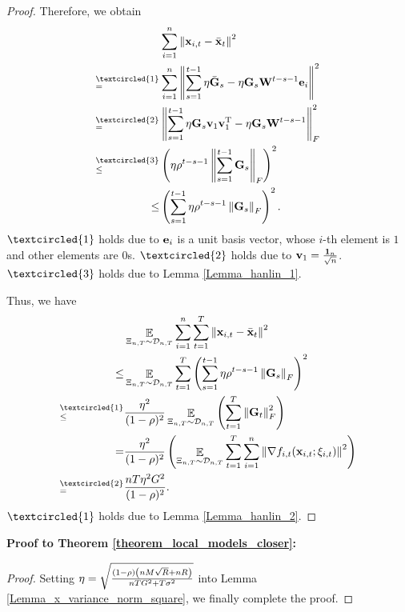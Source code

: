 \documentclass{article}
\begin{document}
\begin{proof}
Therefore, we obtain
\begin{align}
\nonumber
& \sum_{i=1}^n \lrnorm{\x_{i,t} - \bar{\x}_t}^2 \\ \nonumber
\refabovecir{=}{\textcircled{1}} & \sum_{i=1}^n \lrnorm{ \sum_{s=1}^{t-1} \eta \bar{\G}_s - \eta \G_s \W^{t-s-1}\e_i }^2   \\ \nonumber
\refabovecir{=}{\textcircled{2}} & \lrnorm{ \sum_{s=1}^{t-1} \eta \G_s\v_1 \v_1\Tr - \eta \G_s \W^{t-s-1} }^2_F   \\ \nonumber
\refabovecir{\le}{\textcircled{3}} & \lrincir{ \eta \rho^{t-s-1} \lrnorm{\sum_{s=1}^{t-1}\G_s}_F}^2 \\ \nonumber
\le & \lrincir{ \sum_{s=1}^{t-1} \eta \rho^{t-s-1} \lrnorm{\G_s}_F}^2.
\end{align} $\textcircled{1}$ holds due to ${\bf e}_i$ is a unit basis vector, whose $i$-th element is $1$ and other elements are $0$s. $\textcircled{2}$ holds due to ${\bf v}_1 = \frac{{\bf 1}_n}{\sqrt{n}}$. $\textcircled{3}$ holds due to Lemma \ref{Lemma_hanlin_1}. 


Thus, we  have
\begin{align}
\nonumber
& \EE_{ \Xi_{n,T} \sim \Dcal_{n,T} } \sum_{i=1}^n\sum_{t=1}^T \lrnorm{\x_{i,t} - \bar{\x}_t}^2  \\ \nonumber 
\le & \EE_{ \Xi_{n,T} \sim \Dcal_{n,T} } \sum_{t=1}^T \lrincir{ \sum_{s=1}^{t-1} \eta \rho^{t-s-1} \lrnorm{\G_s}_F}^2  \\ \nonumber
\refabovecir{\le}{\textcircled{1}} & \frac{\eta^2}{(1-\rho)^2} \EE_{ \Xi_{n,T} \sim \Dcal_{n,T} } \lrincir{  \sum_{t=1}^T \lrnorm{\G_t}_F^2 } \\ \nonumber
= & \frac{\eta^2}{(1-\rho)^2} \lrincir{ \EE_{ \Xi_{n,T} \sim \Dcal_{n,T} } \sum_{t=1}^T \sum_{i=1}^n  \lrnorm{\nabla f_{i,t}(\x_{i,t};\xi_{i,t})}^2 } \\ \nonumber
\refabovecir{=}{\textcircled{2}} & \frac{nT\eta^2 G^2 }{(1-\rho)^2}.
\end{align} $\textcircled{1}$ holds due to Lemma \ref{Lemma_hanlin_2}. 
\end{proof}

\textbf{Proof to Theorem \ref{theorem_local_models_closer}:}
\begin{proof}
Setting $\eta = \sqrt{\frac{(1-\rho) \left( nM\sqrt{R} + nR \right)}{ nTG^2 + T\sigma^2 }}$ into Lemma \ref{Lemma_x_variance_norm_square}, we finally complete the proof.
\end{proof}
\end{document}

